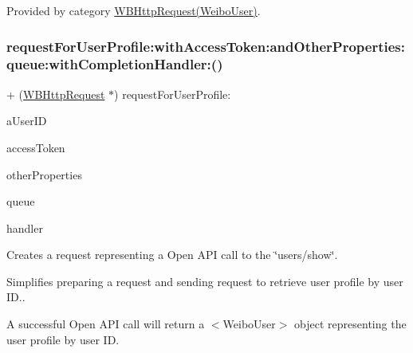 Provided by category \mbox{\hyperlink{category_w_b_http_request_07_weibo_user_08_ac5c54cd942ec3972dce639a4a299d812}{W\+B\+Http\+Request(\+Weibo\+User)}}.

\mbox{\label{interface_w_b_http_request_ac5c54cd942ec3972dce639a4a299d812}} 
\subsubsection{\texorpdfstring{request\+For\+User\+Profile\+:with\+Access\+Token\+:and\+Other\+Properties\+:queue\+:with\+Completion\+Handler\+:()}{requestForUserProfile:withAccessToken:andOtherProperties:queue:withCompletionHandler:()}\hspace{0.1cm}{\footnotesize\ttfamily [2/3]}}
{\footnotesize\ttfamily + (\mbox{\hyperlink{interface_w_b_http_request}{W\+B\+Http\+Request}} $\ast$) request\+For\+User\+Profile\+: \begin{DoxyParamCaption}\item[{(N\+S\+String $\ast$)}]{a\+User\+ID }\item[{withAccessToken:(N\+S\+String $\ast$)}]{access\+Token }\item[{andOtherProperties:(N\+S\+Dictionary $\ast$)}]{other\+Properties }\item[{queue:(N\+S\+Operation\+Queue $\ast$)}]{queue }\item[{withCompletionHandler:(W\+B\+Request\+Handler)}]{handler }\end{DoxyParamCaption}}

Creates a request representing a Open A\+PI call to the \char`\"{}users/show\char`\"{}.

Simplifies preparing a request and sending request to retrieve user profile by user ID..

A successful Open A\+PI call will return a $<$\+Weibo\+User$>$ object representing the user profile by user ID.

